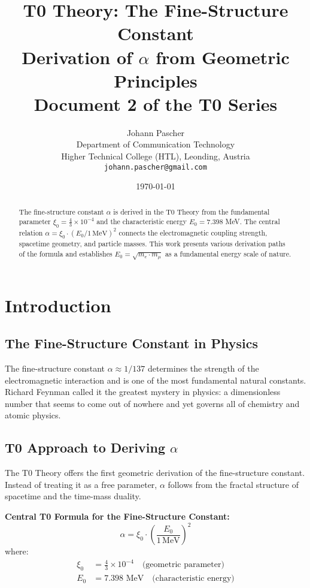 \documentclass[12pt,a4paper]{article}
\title{\textbf{T0 Theory: The Fine-Structure Constant}\\[0.5cm]
	\large Derivation of $\alpha$ from Geometric Principles\\[0.3cm]
	\normalsize Document 2 of the T0 Series}
\author{Johann Pascher\\
	Department of Communication Technology\\
	Higher Technical College (HTL), Leonding, Austria\\
	\texttt{johann.pascher@gmail.com}}
\date{\today}
\newcommand{\xipar}{\xi_0}
\newcommand{\Ezero}{E_0}
\begin{document}
	
	\maketitle
	
	\begin{abstract}
		The fine-structure constant $\alpha$ is derived in the T0 Theory from the fundamental parameter $\xipar = \frac{4}{3} \times 10^{-4}$ and the characteristic energy $\Ezero = 7.398$ MeV. The central relation $\alpha = \xipar \cdot (\Ezero/1\,\text{MeV})^2$ connects the electromagnetic coupling strength, spacetime geometry, and particle masses. This work presents various derivation paths of the formula and establishes $\Ezero = \sqrt{m_e \cdot m_\mu}$ as a fundamental energy scale of nature.
	\end{abstract}
	
	\tableofcontents
	\newpage
	
	\section{Introduction}
	
	\subsection{The Fine-Structure Constant in Physics}
	
	The fine-structure constant $\alpha \approx 1/137$ determines the strength of the electromagnetic interaction and is one of the most fundamental natural constants. Richard Feynman called it the greatest mystery in physics: a dimensionless number that seems to come out of nowhere and yet governs all of chemistry and atomic physics.
	
	\subsection{T0 Approach to Deriving $\alpha$}
	
	The T0 Theory offers the first geometric derivation of the fine-structure constant. Instead of treating it as a free parameter, $\alpha$ follows from the fractal structure of spacetime and the time-mass duality.
	
	\begin{keyresult}
		\textbf{Central T0 Formula for the Fine-Structure Constant:}
		\begin{equation}
			\boxed{\alpha = \xipar \cdot \left(\frac{\Ezero}{1\,\text{MeV}}\right)^2}
			\label{eq:alpha_main}
		\end{equation}
		where:
		\begin{align}
			\xipar &= \frac{4}{3} \times 10^{-4} \quad \text{(geometric parameter)}\\
			\Ezero &= 7.398 \text{ MeV} \quad \text{(characteristic energy)}
		\end{align}
	\end{keyresult}
	
\end{document}
